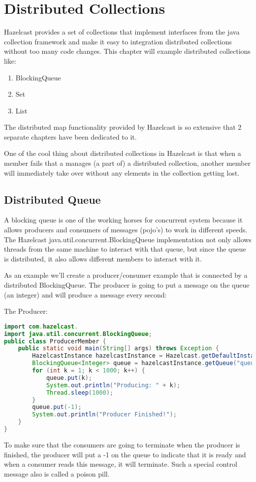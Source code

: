 \chapter{Distributed Collections}
Hazelcast provides a set of collections that implement interfaces from the java collection framework and make it easy to integration distributed collections without too many code changes. This chapter will example distributed collections like:
\begin{enumerate}
\item BlockingQueue
\item Set
\item List
\end{enumerate}
The distributed map functionality provided by Hazelcast is so extensive that 2 separate chapters have been dedicated to it. 

One of the cool thing about distributed collections in Hazelcast is that when a member fails that a manages (a part of) a distributed collection, another member will immediately take over without any elements in the collection getting lost.

\section{Distributed Queue}
A blocking queue is one of the working horses for concurrent system because it allows producers and consumers of messages (pojo's) to work in different speeds. The Hazelcast java.util.concurrent.BlockingQueue implementation not only allows threads from the same machine to interact with that queue, but since the queue is distributed, it also allows different members to interact with it.

As an example we'll create a producer/consumer example that is connected by a distributed BlockingQueue. The producer is going to put a message on the queue (an integer) and will produce a message every second:

The Producer:
\begin{lstlisting}[language=java]
import com.hazelcast.
import java.util.concurrent.BlockingQueue;
public class ProducerMember {
    public static void main(String[] args) throws Exception {
        HazelcastInstance hazelcastInstance = Hazelcast.getDefaultInstance();
        BlockingQueue<Integer> queue = hazelcastInstance.getQueue("queue");
        for (int k = 1; k < 1000; k++) {
            queue.put(k);
            System.out.println("Producing: " + k);
            Thread.sleep(1000);
        }
        queue.put(-1);
        System.out.println("Producer Finished!");
    }
}
\end{lstlisting}
To make sure that the consumers are going to terminate when the producer is finished, the producer will put a -1 on the queue to indicate that it is ready and when a consumer reads this message, it will terminate. Such a special control message also is called a poison pill.

